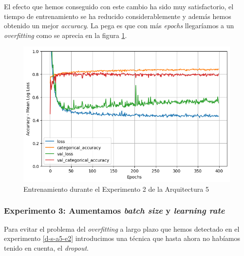 \documentclass{article}
\begin{document}
		    El efecto que hemos conseguido con este cambio ha sido muy satisfactorio, el tiempo de entrenamiento se ha reducido considerablemente y adem\'as hemos obtenido un mejor \textit{accuracy}. La pega es que con m\'as \textit{epochs} llegar\'iamos a un \textit{overfitting} como se aprecia en la figura \ref{d-tr-a5-e2}.
		    
			\begin{figure}[!h]
				\begin{center}
					\includegraphics[scale=0.5]{d-tr-a5-e2.png}		
					\caption{Entrenamiento durante el Experimento 2 de la Arquitectura 5}	
					\label{d-tr-a5-e2}
				\end{center}
			\end{figure}
		
		\subsubsection{Experimento 3: Aumentamos \textit{batch size} y \textit{learning rate}}
		\label{d-s-a5-e3}
			Para evitar el problema del \textit{overfitting} a largo plazo que hemos detectado en el experimento \ref{d-s-a5-e2} introducimos una t\'ecnica que hasta ahora no hab\'iamos tenido en cuenta, el \textit{dropout}.
		
\end{document}
